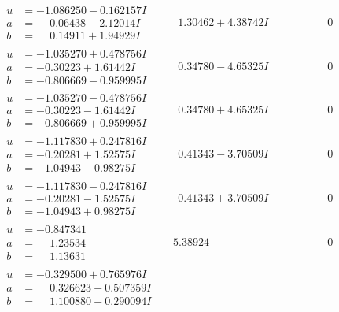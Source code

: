 \documentclass[1p]{elsarticle_modified}
\theoremstyle{definition}
\begin{document}
$$\begin{array}{c|c|c}
\begin{aligned}
u &= -1.086250 - 0.162157 I \\
a &= \phantom{-}0.06438 - 2.12014 I \\
b &= \phantom{-}0.14911 + 1.94929 I\end{aligned}
 & \phantom{-}1.30462 + 4.38742 I & \phantom{-0.000000 } 0 \\ \hline\begin{aligned}
u &= -1.035270 + 0.478756 I \\
a &= -0.30223 + 1.61442 I \\
b &= -0.806669 - 0.959995 I\end{aligned}
 & \phantom{-}0.34780 - 4.65325 I & \phantom{-0.000000 } 0 \\ \hline\begin{aligned}
u &= -1.035270 - 0.478756 I \\
a &= -0.30223 - 1.61442 I \\
b &= -0.806669 + 0.959995 I\end{aligned}
 & \phantom{-}0.34780 + 4.65325 I & \phantom{-0.000000 } 0 \\ \hline\begin{aligned}
u &= -1.117830 + 0.247816 I \\
a &= -0.20281 + 1.52575 I \\
b &= -1.04943 - 0.98275 I\end{aligned}
 & \phantom{-}0.41343 - 3.70509 I & \phantom{-0.000000 } 0 \\ \hline\begin{aligned}
u &= -1.117830 - 0.247816 I \\
a &= -0.20281 - 1.52575 I \\
b &= -1.04943 + 0.98275 I\end{aligned}
 & \phantom{-}0.41343 + 3.70509 I & \phantom{-0.000000 } 0 \\ \hline\begin{aligned}
u &= -0.847341\phantom{ +0.000000I} \\
a &= \phantom{-}1.23534\phantom{ +0.000000I} \\
b &= \phantom{-}1.13631\phantom{ +0.000000I}\end{aligned}
 & -5.38924\phantom{ +0.000000I} & \phantom{-0.000000 } 0 \\ \hline\begin{aligned}
u &= -0.329500 + 0.765976 I \\
a &= \phantom{-}0.326623 + 0.507359 I \\
b &= \phantom{-}1.100880 + 0.290094 I\end{aligned}

\end{array}$$
\end{document}
